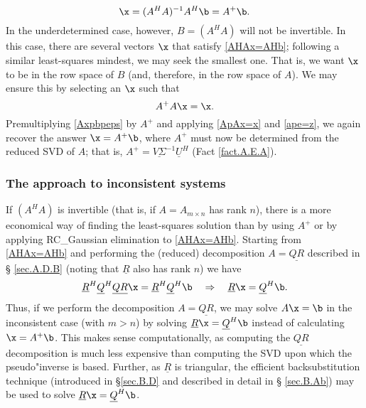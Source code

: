 \begin{equation}
\x=(A^{H} A)^{-1}A^{H}\b=A^{+}\b.
\label{Aplussol}
\end{equation}
In the underdetermined case, however, $B=(A^{H} A)$ will not be
invertible.  In this case, there are several vectors $\x$ that satisfy
\eqref{AHAx=AHb}; following a similar least-squares mindest, we may
seek the smallest one.  That is, we want $\x$ to be in the row space
of $B$ (and, therefore, in the row space of $A$).  We may ensure this
by selecting an $\x$ such that
\begin{equation}
A^{+} A\x=\x.
\label{ApAx=x}
\end{equation}
Premultiplying \eqref{Axpbpeps} by $A^{+}$ and applying \eqref{ApAx=x}
and \eqref{ape=z}, we again recover the answer $\x=A^{+}\b$, where
$A^{+}$ must now be determined from the reduced SVD of $A$; that is, $A^{+}=\underline{V \Sigma}^{-1} \underline{U}^{H}$ (Fact \ref{fact.A.E.A}).

\subsubsection{The  approach to inconsistent systems}\label{sec:QRinconsys}

If $(A^{H} A)$ is invertible (that is, if $A=A_{m\times n}$ has rank
$n$), there is a more economical way of finding the least-squares
solution than by using $A^{+}$ or by applying RC_Gaussian elimination to
\eqref{AHAx=AHb}.  Starting from \eqref{AHAx=AHb} and performing the
(reduced) decomposition $A=\underline{QR}$ described in \S
\ref{sec.A.D.B} (noting that $\underline{R}$ also has rank $n$) we
have
\begin{equation*}
    \underline{R}^{H} \underline{Q}^{H} \underline{Q R} \x = \underline{R}^{H} \underline{Q}^{H} \b \quad \Rightarrow \quad
    \underline{R}\x=\underline{Q}^{H} \b.
\end{equation*}
Thus, if we perform the decomposition $A=\underline{QR}$, we may solve
$A\x=\b$ in the inconsistent case (with $m>n$) by solving
$\underline{R}\x=\underline{Q}^{H} \b$ instead of calculating
$\x=A^{+}\b$.  This makes sense computationally, as computing
the $\underline{QR}$ decomposition is much less expensive than
computing the SVD upon which the pseudo"inverse is based.  Further, as
$\underline{R}$ is triangular, the efficient backsubstitution
technique (introduced in \S \ref{sec.B.D} and described in detail in \S
\ref{sec.B.Ab}) may be used to solve $\underline{R}\x=\underline{Q}^{H}
\b$.

